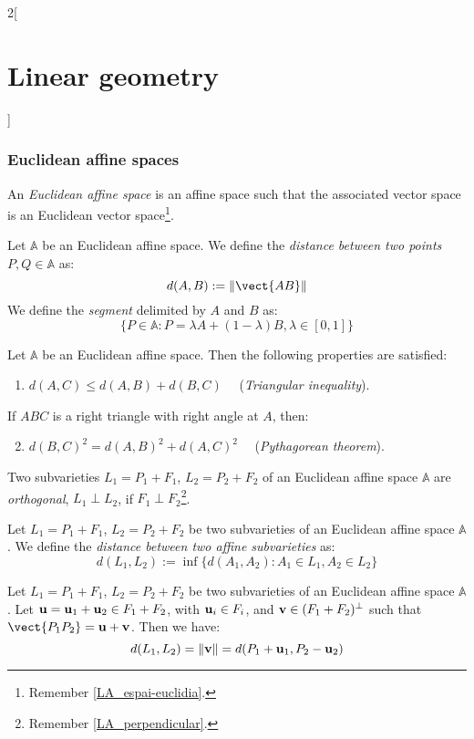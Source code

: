 \documentclass[../../../main.tex]{subfiles}
\begin{document}
\begin{multicols}{2}[\section{Linear geometry}]
  \subsubsection{Euclidean affine spaces}
  \begin{definition}
    An \emph{Euclidean affine space} is an affine space such that the associated vector space is an Euclidean vector space\footnote{Remember \cref{LA_espai-euclidia}.}.
  \end{definition}
  \begin{definition}
    Let $\mathbb{A}$ be an Euclidean affine space. We define the \emph{distance between two points} $P,Q\in\mathbb{A}$ as: $$d(A,B):=\|\vect{AB}\|$$ We define the \emph{segment} delimited by $A$ and $B$ as: $$\{P\in\mathbb{A}:P=\lambda A+(1-\lambda)B,\lambda\in[0,1]\}$$
  \end{definition}
  \begin{proposition}
    Let $\mathbb{A}$ be an Euclidean affine space. Then the following properties are satisfied:
    \begin{enumerate}
      \item $d(A,C)\leq d(A,B)+d(B,C)\quad$ (\emph{Triangular inequality}).
    \end{enumerate}
    If $ABC$ is a right triangle with right angle at $A$, then:
    \begin{enumerate}
      \setcounter{enumi}{1}
      \item $d(B,C)^2=d(A,B)^2+d(A,C)^2\quad$ (\emph{Pythagorean theorem}).
    \end{enumerate}
  \end{proposition}
  \begin{definition}
    Two subvarieties $L_1=P_1+F_1$, $L_2=P_2+F_2$ of an Euclidean affine space $\mathbb{A}$ are \emph{orthogonal}, $L_1\perp L_2$, if $F_1\perp F_2$\footnote{Remember \cref{LA_perpendicular}.}.
  \end{definition}
  \begin{definition}
    Let $L_1=P_1+F_1$, $L_2=P_2+F_2$ be two subvarieties of an Euclidean affine space $\mathbb{A}$. We define the \emph{distance between two affine subvarieties} as: $$d(L_1,L_2):=\inf\{d(A_1,A_2):A_1\in L_1, A_2\in L_2\}$$
  \end{definition}
  \begin{theorem}
    Let $L_1=P_1+F_1$, $L_2=P_2+F_2$ be two subvarieties of an Euclidean affine space $\mathbb{A}$. Let $\boldsymbol{\mathrm{u}}=\boldsymbol{\mathrm{u}}_1+\boldsymbol{\mathrm{u}}_2\in F_1+F_2$, with $\boldsymbol{\mathrm{u}}_i\in F_i$, and $\boldsymbol{\mathrm{v}}\in(F_1+F_2)^\perp$ such that $\vect{P_1P_2}=\vf{u}+\vf{v}$. Then we have: $$d(L_1,L_2)=\|\boldsymbol{\mathrm{v}}\|=d(P_1+\boldsymbol{\mathrm{u}}_1,P_2-\boldsymbol{\mathrm{u}}_2)$$
  \end{theorem}

\end{multicols}
\end{document}
